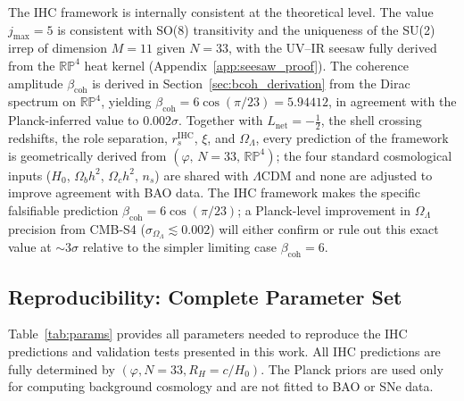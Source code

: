 \documentclass[12pt,a4paper]{article}
\begin{document}
The IHC framework is internally consistent at the theoretical level. The value $j_\mathrm{max} = 5$ is consistent with SO(8) transitivity and the uniqueness of the SU(2) irrep of dimension $M=11$ given $N=33$, with the UV--IR seesaw fully derived from the $\mathbb{RP}^4$ heat kernel (Appendix~\ref{app:seesaw_proof}). The coherence
amplitude $\beta_\mathrm{coh}$ is derived in Section~\ref{sec:bcoh_derivation}
from the Dirac spectrum on $\mathbb{RP}^4$, yielding $\beta_\mathrm{coh} =
6\cos(\pi/23) = 5.94412$, in agreement with the Planck-inferred value to
$0.002\sigma$. Together with $L_\mathrm{net} = -\tfrac{1}{2}$, the shell
crossing redshifts, the role separation, $r_s^\mathrm{IHC}$, $\xi$, and
$\Omega_\Lambda$, every prediction of the framework is geometrically derived
from $(\varphi,\, N = 33,\, \mathbb{RP}^4)$; the four standard cosmological
inputs ($H_0$, $\Omega_b h^2$, $\Omega_c h^2$, $n_s$) are shared with
$\Lambda$CDM and none are adjusted to improve agreement with BAO data.
The IHC framework makes the specific falsifiable
prediction $\beta_\mathrm{coh} = 6\cos(\pi/23)$; a Planck-level improvement
in $\Omega_\Lambda$ precision from CMB-S4 ($\sigma_{\Omega_\Lambda} \lesssim
0.002$) will either confirm or rule out this exact value at $\sim$3$\sigma$
relative to the simpler limiting case $\beta_\mathrm{coh} = 6$.

\subsection{Reproducibility: Complete Parameter Set}

Table~\ref{tab:params} provides all parameters needed to reproduce the IHC predictions
and validation tests presented in this work. All IHC predictions are fully determined
by $(\varphi, N = 33, R_H = c/H_0)$. The Planck priors are used only for computing
background cosmology and are not fitted to BAO or SNe data.
\end{document}
